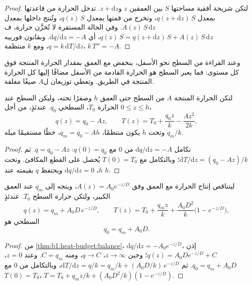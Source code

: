 \begin{proof}
لتكن شريحة أفقية مساحتها $S$ بين العمقين $z$ و$z +
\mathrm dz$. تدخل الحرارة من قاعدتها بمعدل $q(z + \mathrm dz)\,S$، وتخرج من قمتها بمعدل $q(z)\,S$، وتُنتج داخلها بمعدل $A(z)\,S\,\mathrm dz$. وفي الحالة المستقرة لا تُخزَّن حرارة، ف$q(z)\,S = q(z + \mathrm dz)\,S + A(z)\,S\,\mathrm dz$، أي $\mathrm dq/\mathrm dz = -A$. وبقانون فورييه $q = k\,\mathrm dT/\mathrm dz$، ومع $k$ منتظمة، $k\,T'' = -A$.
\end{proof}

وعند القراءة من السطح نحو الأسفل، ينخفض  مع العمق بمقدار الحرارة المنتجة فوق كل مستوى: فما يعبر السطح هو الحرارة القادمة من الأسفل مضافًا إليها كل الحرارة المنتجة في الطريق. وتعطي توزيعان ل$A$ صيغًا مغلقة.

\begin{proposition}\label{prop:b1:heat-budget:uniform}
لتكن الحرارة المنتجة $A$ من السطح حتى العمق $h$ وصفرًا تحته، وليكن السطح عند الحرارة $T_0$،  السطحي $q_0$. عندئذٍ، من أجل $0 \le z \le h$،
\[
  q(z) = q_0 - A z, \qquad T(z) = T_0 + \frac{q_0 z}{k} - \frac{A z^2}{2k},
\]
وتحت $h$ يكون  منتظمًا، $q_m = q_0 - A h$،  خطًا مستقيمًا ميله $q_m/k$.
\end{proposition}

\begin{proof}
نكامل $\mathrm dq/\mathrm dz = -A$ من $0$ مع $q(0) = q_0$: $q = q_0 -
Az$. ثم $\mathrm dT/\mathrm dz = (q_0 - Az)/k$؛ وبالتكامل مع $T(0) = T_0$ يُحصل على القطع المكافئ. وتحت $h$، $\mathrm dq/\mathrm dz = 0$ ويحتفظ $q$ بقيمته عند $h$.
\end{proof}

\begin{theorem}
\label{thm:b1:heat-budget:exponential}
ليتناقص إنتاج الحرارة مع العمق وفق $A(z) = A_0 e^{-z/D}$، ويتجه  إلى $q_m$ عند العمق الكبير، ولتكن حرارة السطح $T_0$. عندئذٍ
\[
  q(z) = q_m + A_0 D\,e^{-z/D}, \qquad
  T(z) = T_0 + \frac{q_m z}{k} + \frac{A_0 D^2}{k}\bigl(1 - e^{-z/D}\bigr),
\]
 السطحي هو
\[
  q_0 = q_m + A_0 D .
\]
\end{theorem}

\begin{proof}
من \cref{thm:b1:heat-budget:balance}، $\mathrm dq/\mathrm dz =
-A_0e^{-z/D}$، إذن $q(z) = A_0 D e^{-z/D} + C$؛ وحين $z \to \infty$، $q \to C$، ومنه $C = q_m$. وعند $z = 0$، $q_0 = q_m + A_0 D$. ثم $\mathrm dT/\mathrm dz =
q/k = q_m/k + (A_0D/k)\,e^{-z/D}$، وبالتكامل من $0$ مع $T(0) = T_0$،
$T = T_0 + q_m z/k + (A_0 D^2/k)(1 - e^{-z/D})$.
\end{proof}

